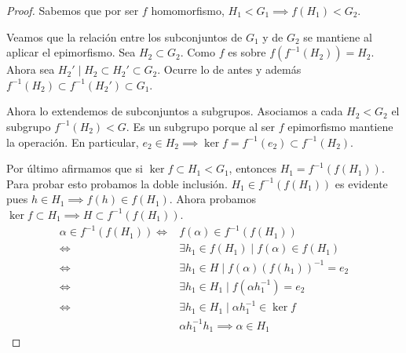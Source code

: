 \documentclass{book}
\theoremstyle{definition}
\theoremstyle{remark}
\newcommand{\inv}[1]{#1^{-1}}
\begin{document}
\begin{proof}
	Sabemos que por ser $f$ homomorfismo, $H_1 < G_1 \implies f(H_1) < G_2$.
	
	Veamos que la relación entre los subconjuntos de $G_1$ y de $G_2$ se mantiene al aplicar el epimorfismo. Sea $H_2 \subset G_2$. Como $f$ es sobre $f(\inv{f}(H_2)) = H_2$. Ahora sea $H_2' \mid H_2 \subset H_2' \subset G_2$. Ocurre lo de antes y además $\inv{f}(H_2) \subset \inv{f}(H_2') \subset G_1$.
	
	Ahora lo extendemos de subconjuntos a subgrupos. Asociamos a cada $H_2 < G_2$ el subgrupo $\inv{f}(H_2) < G$. Es un subgrupo porque al ser $f$ epimorfismo mantiene la operación. En particular, $e_2 \in H_2 \implies \ker f = \inv{f}(e_2) \subset \inv{f}(H_2)$.
	
	Por último afirmamos que si $\ker f \subset H_1 < G_1$, entonces $H_1 = \inv{f}(f(H_1))$. Para probar esto probamos la doble inclusión. $H_1 \in \inv{f}(f(H_1))$ es evidente pues $h \in H_1 \implies f(h) \in f(H_1)$. Ahora probamos $\ker f \subset H_1 \implies H \subset \inv{f}(f(H_1))$.
	\begin{align*}
		\alpha \in \inv{f}(f(H_1)) \iff& f(\alpha) \in \inv{f}(f(H_1)) \\
		\iff& \exists h_1 \in f(H_1) \mid f(\alpha) \in f(H_1) \\
		\iff& \exists h_1 \in H \mid f(\alpha)\inv{(f(h_1))} = e_2 \\
		\iff& \exists h_1 \in H_1 \mid f(\alpha \inv{h_1}) = e_2 \\
		\iff& \exists h_1 \in H_1 \mid \alpha \inv{h_1} \in \ker f \\
		&\alpha \inv{h_1} h_1 \implies \alpha \in H_1
	\end{align*}
\end{proof}

\begin{figure}[h]
	\centering
\end{figure}
\end{document}

